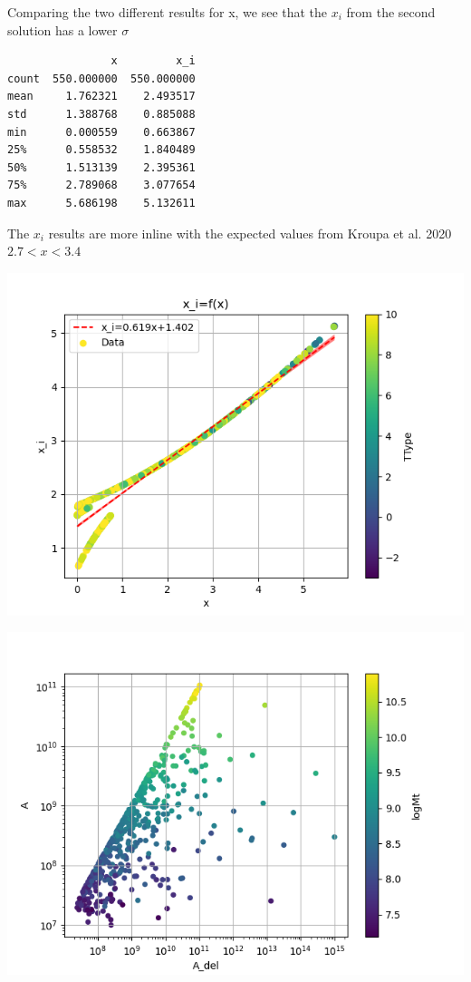 \documentclass[a4paper]{article}
\begin{document}
Comparing the two different results for x, we see that the \(x_i\) from the second solution has a lower \(\sigma\)
\begin{verbatim}
                x         x_i
count  550.000000  550.000000
mean     1.762321    2.493517
std      1.388768    0.885088
min      0.000559    0.663867
25%      0.558532    1.840489
50%      1.513139    2.395361
75%      2.789068    3.077654
max      5.686198    5.132611
\end{verbatim}


The \(x_i\) results are more inline with the expected values from Kroupa et al. 2020 \(2.7<x<3.4\)
\begin{center}
\includegraphics[width=.9\linewidth]{./graphs/x-x_i.png}
\end{center}

\begin{center}
\includegraphics[width=.9\linewidth]{./graphs/A-A_del.png}
\end{center}
\end{document}
